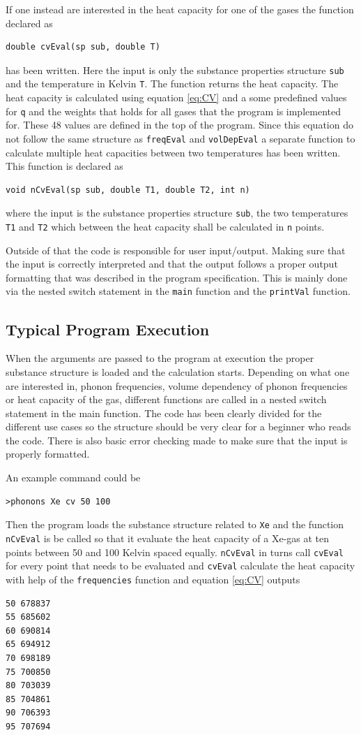 \documentclass[11pt]{article}
\begin{document}
If one instead are interested in the heat capacity for one of the gases the function declared as
\begin{lstlisting}
double cvEval(sp sub, double T)
\end{lstlisting} 
has been written. Here the input is only the substance properties structure \verb+sub+ and the temperature in Kelvin \verb+T+. The function returns the heat capacity. The heat capacity is calculated using equation \ref{eq:CV} and a some predefined values for \verb+q+ and the weights that holds for all gases that the program is implemented for. These 48 values are defined in the top of the program. Since this equation do not follow the same structure as \verb+freqEval+ and \verb+volDepEval+ a separate function to calculate multiple heat capacities between two temperatures has been written. This function is declared as
\begin{lstlisting}
void nCvEval(sp sub, double T1, double T2, int n)
\end{lstlisting}
where the input is the substance properties structure \verb+sub+, the two temperatures \verb+T1+ and \verb+T2+ which between the heat capacity shall be calculated in \verb+n+ points.  

Outside of that the code is responsible for user input/output. Making sure that the input is correctly interpreted and that the output follows a proper output formatting that was described in the program specification. This is mainly done via the nested switch statement in the \verb+main+ function and the \verb+printVal+ function.

\subsection{Typical Program Execution}
When the arguments are passed to the program at execution the proper substance structure is loaded and the calculation starts. Depending on what one are interested in, phonon frequencies, volume dependency of phonon frequencies or heat capacity of the gas, different functions are called in a nested switch statement in the main function. The code has been clearly divided for the different use cases so the structure should be very clear for a beginner who reads the code. There is also basic error checking made to make sure that the input is properly formatted.

An example command could be
\begin{lstlisting}
>phonons Xe cv 50 100
\end{lstlisting}
Then the program loads the substance structure related to \verb+Xe+ and the function \verb+nCvEval+ is be called so that it evaluate the heat capacity of a Xe-gas at ten points between 50 and 100 Kelvin spaced equally. \verb+nCvEval+ in turns call \verb+cvEval+ for every point that needs to be evaluated and \verb+cvEval+ calculate the heat capacity with help of the \verb+frequencies+ function and equation \ref{eq:CV} outputs
\begin{lstlisting}
50 678837
55 685602
60 690814
65 694912
70 698189
75 700850
80 703039
85 704861
90 706393
95 707694
\end{lstlisting}
\end{document}
